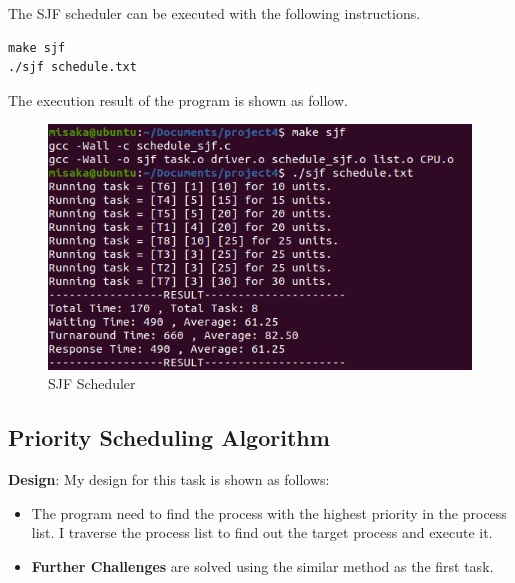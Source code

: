 \documentclass[UTF8,10pt,a4paper]{article}
\theoremstyle{Problem}
\theoremstyle{Solution}
\begin{document}
The SJF scheduler can be executed with the following instructions.
\begin{lstlisting}
make sjf
./sjf schedule.txt
\end{lstlisting}

The execution result of the program is shown as follow.

\begin{figure}[H]
    \centering
    \includegraphics[width=400pt]{2sjf.png}
    \caption{SJF Scheduler}
\end{figure}

\subsection{Priority Scheduling Algorithm}

\textbf{Design}: My design for this task is shown as follows:

\begin{itemize}
    \item The program need to find the process with the highest priority in the process list. I traverse the process list to find out the target process and execute it.
    \item \textbf{Further Challenges} are solved using the similar method as the first task.
\end{itemize}
\end{document}
